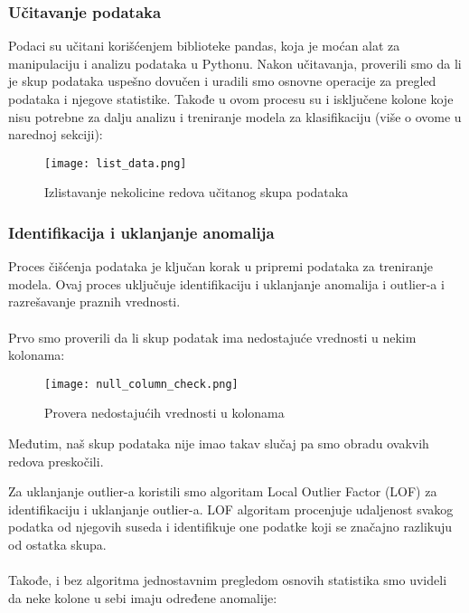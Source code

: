 \documentclass[a4paper,12pt]{article}
\begin{document}
\subsubsection{Učitavanje podataka}
Podaci su učitani korišćenjem biblioteke pandas, koja je moćan alat za manipulaciju i analizu podataka u Pythonu. Nakon učitavanja, proverili smo da li je skup podataka uspešno dovučen i uradili smo osnovne operacije za pregled podataka i njegove statistike. Takođe u ovom procesu su i isključene kolone koje nisu potrebne za dalju analizu i treniranje modela za klasifikaciju (više o ovome u narednoj sekciji):

\begin{figure}[h!]
\centering
\texttt{[image: list\_data.png]}
\caption{Izlistavanje nekolicine redova učitanog skupa podataka}
\label{fig:sql_query}
\end{figure}

\clearpage

\subsubsection{Identifikacija i uklanjanje anomalija}
Proces čišćenja podataka je ključan korak u pripremi podataka za treniranje modela. Ovaj proces uključuje identifikaciju i uklanjanje anomalija i outlier-a i razrešavanje praznih vrednosti.\\\\
Prvo smo proverili da li skup podatak ima nedostajuće vrednosti u nekim kolonama:

\begin{figure}[h!]
\centering
\texttt{[image: null\_column\_check.png]}
\caption{Provera nedostajućih vrednosti u kolonama}
\label{fig:sql_query}
\end{figure}

Međutim, naš skup podataka nije imao takav slučaj pa smo obradu ovakvih redova preskočili.

\clearpage
Za uklanjanje outlier-a koristili smo algoritam Local Outlier Factor (LOF) za identifikaciju i uklanjanje outlier-a. LOF algoritam procenjuje udaljenost svakog podatka od njegovih suseda i identifikuje one podatke koji se značajno razlikuju od ostatka skupa.\\\\
Takođe, i bez algoritma jednostavnim pregledom osnovih statistika smo uvideli da neke kolone u sebi imaju određene anomalije:\\\\
\end{document}
